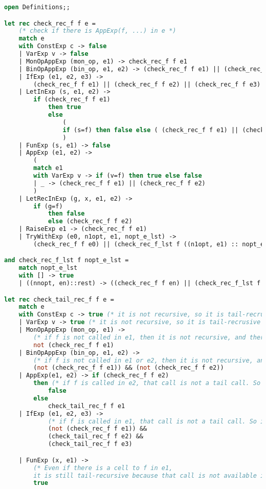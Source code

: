 \begin{lstlisting}[language=Caml, caption=checktailRec.ml]
open Definitions;;

let rec check_rec_f f e =
    (* check if there is AppExp(f, ...) in e *)
    match e 
    with ConstExp c -> false
    | VarExp v -> false
    | MonOpAppExp (mon_op, e1) -> check_rec_f f e1
    | BinOpAppExp (bin_op, e1, e2) -> (check_rec_f f e1) || (check_rec_f f e2)
    | IfExp (e1, e2, e3) ->
        (check_rec_f f e1) || (check_rec_f f e2) || (check_rec_f f e3)
    | LetInExp (s, e1, e2) ->
        if (check_rec_f f e1) 
            then true
            else
                (
                if (s=f) then false else ( (check_rec_f f e1) || (check_rec_f f e2) )
                )
    | FunExp (s, e1) -> false
    | AppExp (e1, e2) -> 
        (
        match e1
        with VarExp v -> if (v=f) then true else false
        | _ -> (check_rec_f f e1) || (check_rec_f f e2)
        )
    | LetRecInExp (g, x, e1, e2) -> 
        if (g=f) 
            then false 
            else (check_rec_f f e2)
    | RaiseExp e1 -> (check_rec_f f e1)
    | TryWithExp (e0, n1opt, e1, nopt_e_lst) ->
        (check_rec_f f e0) || (check_rec_f_lst f ((n1opt, e1) :: nopt_e_lst) )

and check_rec_f_lst f nopt_e_lst = 
    match nopt_e_lst  
    with [] -> true
    | ((nnopt, en)::rest) -> ((check_rec_f f en) || (check_rec_f_lst f rest));;

let rec check_tail_rec_f f e =
    match e
    with ConstExp c -> true (* it is not recursive, so it is tail-recrusive  *)
    | VarExp v -> true (* it is not recursive, so it is tail-recrusive  *)
    | MonOpAppExp (mon_op, e1) -> 
        (* if f is not called in e1, then it is not recursive, and therefore tail-recrusive  *)
        not (check_rec_f f e1) 
    | BinOpAppExp (bin_op, e1, e2) -> 
        (* if f is not called in e1 or e2, then it is not recursive, and therefore tail-recrusive  *)
        (not (check_rec_f f e1)) && (not (check_rec_f f e2))
    | AppExp(e1, e2) -> if (check_rec_f f e2)
        then (* if f is called in e2, that call is not a tail call. So it is not tail-recursive.  *)
            false 
        else 
            check_tail_rec_f f e1
    | IfExp (e1, e2, e3) -> 
            (* if f is called in e1, that call is not a tail call. So it is not tail-recursive. *)
            (not (check_rec_f f e1)) &&
            (check_tail_rec_f f e2) && 
            (check_tail_rec_f f e3)

    | FunExp (x, e1) -> 
        (* Even if there is a cell to f in e1, 
        it is still tail-recursive because that call is not available in the body of f. *)
        true 


\end{lstlisting}
